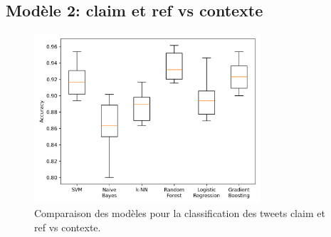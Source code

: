 \subsection{Modèle 2: claim et ref vs contexte}\label{subsec:modele-2:-claim-et-ref-vs-contexte}
\begin{figure}[H]
    \centering
    \includegraphics[width=0.75\textwidth]{images/model_comparison_2}
    \caption{Comparaison des modèles pour la classification des tweets claim et ref vs contexte.}
    \label{fig:model_comparison_clmref_context}
\end{figure}

